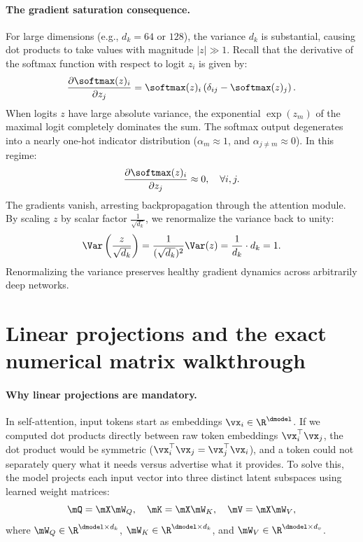 \documentclass[../../main.tex]{subfiles}
\begin{document}
\begin{examinsight}
\paragraph{The gradient saturation consequence.}
For large dimensions (e.g., $d_k = 64$ or $128$), the variance $d_k$ is substantial, causing dot products to take values with magnitude $|z| \gg 1$.
Recall that the derivative of the softmax function with respect to logit $z_i$ is given by:
\begin{equation}
\label{eq:softmax_derivative}
\frac{\partial \softmax(z)_i}{\partial z_j} = \softmax(z)_i \left(\delta_{ij} - \softmax(z)_j\right).
\end{equation}
When logits $z$ have large absolute variance, the exponential $\exp(z_m)$ of the maximal logit completely dominates the sum. The softmax output degenerates into a nearly one-hot indicator distribution ($\alpha_m \approx 1$, and $\alpha_{j \ne m} \approx 0$). In this regime:
\begin{equation}
\frac{\partial \softmax(z)_i}{\partial z_j} \approx 0, \quad \forall i, j.
\end{equation}
The gradients vanish, arresting backpropagation through the attention module.
By scaling $z$ by scalar factor $\frac{1}{\sqrt{d_k}}$, we renormalize the variance back to unity:
\begin{equation}
\label{eq:variance_scaled_dot_product}
\Var\left(\frac{z}{\sqrt{d_k}}\right) = \frac{1}{(\sqrt{d_k})^2}\Var(z) = \frac{1}{d_k} \cdot d_k = 1.
\end{equation}
Renormalizing the variance preserves healthy gradient dynamics across arbitrarily deep networks.
\end{examinsight}

\section{Linear projections and the exact numerical matrix walkthrough}
\label{sec:attention_numerical_walkthrough}

\paragraph{Why linear projections are mandatory.}
In self-attention, input tokens start as embeddings $\vx_i \in \R^{\dmodel}$. If we computed dot products directly between raw token embeddings $\vx_i^\top \vx_j$, the dot product would be symmetric ($\vx_i^\top \vx_j = \vx_j^\top \vx_i$), and a token could not separately query what it needs versus advertise what it provides.
To solve this, the model projects each input vector into three distinct latent subspaces using learned weight matrices:
\begin{equation}
\label{eq:qkv_linear_projections}
\mQ = \mX \mW_Q, \quad \mK = \mX \mW_K, \quad \mV = \mX \mW_V,
\end{equation}
where $\mW_Q \in \R^{\dmodel \times d_k}$, $\mW_K \in \R^{\dmodel \times d_k}$, and $\mW_V \in \R^{\dmodel \times d_v}$.
\end{document}
